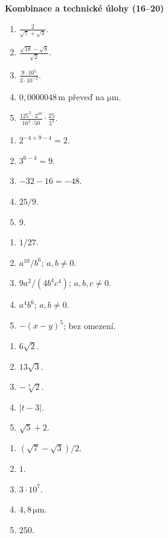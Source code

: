 \documentclass[11pt,a4paper]{article}
\begin{document}
\begin{zadaniReseniBox}[title={Domácí úkol}]
\textbf{Kombinace a technické úlohy (16--20)}\par
\begin{enumerate}[label=\arabic*),start=16]
\item $\displaystyle\frac2{\sqrt7+\sqrt3}$.
\item $\displaystyle\frac{\sqrt{18}-\sqrt8}{\sqrt2}$.
\item $\displaystyle\frac{9\cdot10^5}{3\cdot10^{-2}}$.
\item $0{,}0000048\,\mathrm m$ převeď na $\mathrm{\mu m}$.
\item $\displaystyle\frac{125^2\cdot2^{10}}{16^2\cdot50}\cdot\frac{25}{5^3}$.
\end{enumerate}
\tcblower
\begin{enumerate}[label=\arabic*)]
\item $2^{-4+9-4}=\boxed2$.
\item $3^{6-4}=\boxed9$.
\item $-32-16=\boxed{-48}$.
\item $\boxed{25/9}$.
\item $\boxed9$.
\end{enumerate}

\begin{enumerate}[label=\arabic*),start=6]
\item $\boxed{1/27}$.
\item $\boxed{a^{10}/b^6}$; $a,b\ne0$.
\item $\boxed{9a^2/(4b^4c^4)}$; $a,b,c\ne0$.
\item $\boxed{a^4b^6}$; $a,b\ne0$.
\item $\boxed{-(x-y)^5}$; bez omezení.
\end{enumerate}

\begin{enumerate}[label=\arabic*),start=11]
\item $\boxed{6\sqrt2}$.
\item $\boxed{13\sqrt3}$.
\item $\boxed{-\sqrt[3]2}$.
\item $\boxed{|t-3|}$.
\item $\boxed{\sqrt5+2}$.
\end{enumerate}

\begin{enumerate}[label=\arabic*),start=16]
\item $\boxed{(\sqrt7-\sqrt3)/2}$.
\item $\boxed1$.
\item $\boxed{3\cdot10^7}$.
\item $\boxed{4{,}8\,\mathrm{\mu m}}$.
\item $\boxed{250}$.
\end{enumerate}
\end{zadaniReseniBox}
\end{document}
